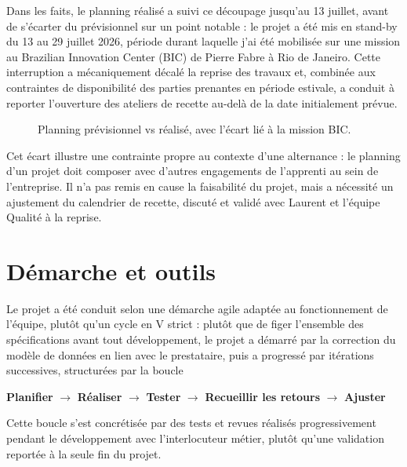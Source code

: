 Dans les faits, le planning réalisé a suivi ce découpage jusqu'au 13 juillet, avant de 
s'écarter du prévisionnel sur un point notable : le projet a été mis en stand-by du 13 au 29 
juillet 2026, période durant laquelle j'ai été mobilisée sur une mission au Brazilian Innovation 
Center (BIC) de Pierre Fabre à Rio de Janeiro. Cette interruption a mécaniquement décalé la 
reprise des travaux et, combinée aux contraintes de disponibilité des parties prenantes en 
période estivale, a conduit à reporter l'ouverture des ateliers de recette au-delà de la date 
initialement prévue.

\begin{figure}[H]
    \centering
    \caption{Planning prévisionnel vs réalisé, avec l'écart lié à la mission BIC.}
    \label{fig:Planning_prévisionnel_et_réalisé}
\end{figure}

Cet écart illustre une contrainte propre au contexte d'une alternance : le planning d'un 
projet doit composer avec d'autres engagements de l'apprenti au sein de l'entreprise. Il n'a pas 
remis en cause la faisabilité du projet, mais a nécessité un ajustement du calendrier de recette, 
discuté et validé avec Laurent et l'équipe Qualité à la reprise.

\section{Démarche et outils}

Le projet a été conduit selon une démarche agile adaptée au fonctionnement de l'équipe, 
plutôt qu'un cycle en V strict : plutôt que de figer l'ensemble des spécifications avant tout 
développement, le projet a démarré par la correction du modèle de données en lien avec le 
prestataire, puis a progressé par itérations successives, structurées par la boucle 

\begin{center}
\small\sffamily
\textbf{Planifier} $\longrightarrow$ 
\textbf{Réaliser} $\longrightarrow$ 
\textbf{Tester} $\longrightarrow$ 
\textbf{Recueillir les retours} $\longrightarrow$ 
\textbf{Ajuster}
\end{center}

Cette boucle s'est concrétisée par des tests et revues réalisés progressivement pendant le 
développement avec l'interlocuteur métier, plutôt qu'une validation reportée à la seule fin du 
projet. \\

